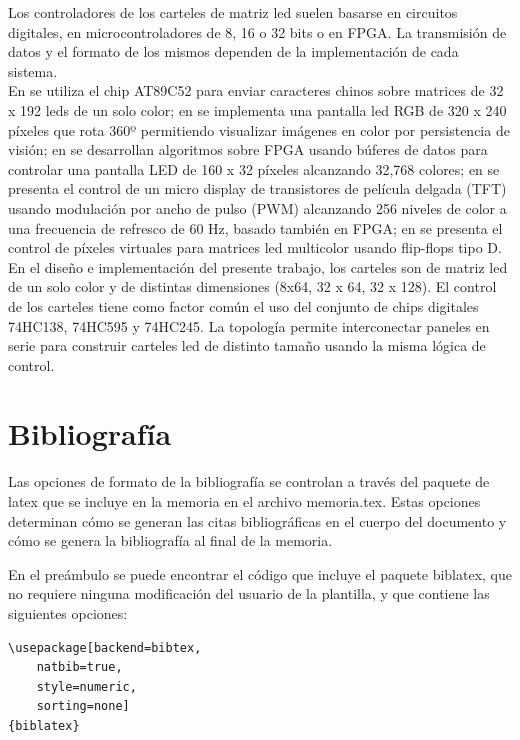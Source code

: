  Los controladores de los carteles de matriz led suelen basarse en circuitos digitales, en microcontroladores de 8, 16 o 32 bits o en FPGA. La transmisión de datos y el formato de los mismos dependen de la implementación de cada sistema.  \\

En \cite{b1} se utiliza el chip AT89C52 para enviar caracteres chinos sobre matrices de 32 x 192 leds de un solo color; en \cite{b2} se implementa una pantalla led RGB de 320 x 240 píxeles que rota 360º permitiendo visualizar imágenes en color por persistencia de visión; en \cite{b3} se desarrollan algoritmos sobre FPGA usando búferes de datos para controlar una pantalla LED de 160 x 32 píxeles alcanzando 32,768 colores; en \cite{b4} se presenta el control de un micro display de transistores de película delgada (TFT) usando modulación por ancho de pulso (PWM) alcanzando 256 niveles de color a una frecuencia de refresco de 60 Hz, basado también en FPGA; en \cite{b5} se presenta el control de píxeles virtuales para matrices led multicolor usando flip-flops tipo D. \\

En el diseño e implementación del presente trabajo, los carteles son de matriz led de un solo color y de distintas dimensiones (8x64, 32 x 64, 32 x 128). El control de los carteles tiene como factor común el uso del conjunto de chips digitales 74HC138, 74HC595 y 74HC245. La topología permite interconectar paneles en serie para construir carteles led de distinto tamaño usando la misma lógica de control. \\

\pagebreak
\section{Bibliografía}
\label{sec:biblio}

Las opciones de formato de la bibliografía se controlan a través del paquete de latex  que se incluye en la memoria en el archivo memoria.tex.  Estas opciones determinan cómo se generan las citas bibliográficas en el cuerpo del documento y cómo se genera la bibliografía al final de la memoria.

En el preámbulo se puede encontrar el código que incluye el paquete biblatex, que no requiere ninguna modificación del usuario de la plantilla, y que contiene las siguientes opciones:

\begin{lstlisting}
\usepackage[backend=bibtex,
	natbib=true, 
	style=numeric, 
	sorting=none]
{biblatex}
\end{lstlisting}


